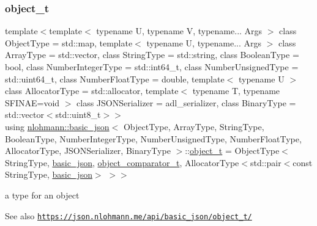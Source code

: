 \subsubsection{\texorpdfstring{object\+\_\+t}{object\_t}}
{\footnotesize\ttfamily template$<$template$<$ typename U, typename V, typename... Args $>$ class Object\+Type = std\+::map, template$<$ typename U, typename... Args $>$ class Array\+Type = std\+::vector, class String\+Type  = std\+::string, class Boolean\+Type  = bool, class Number\+Integer\+Type  = std\+::int64\+\_\+t, class Number\+Unsigned\+Type  = std\+::uint64\+\_\+t, class Number\+Float\+Type  = double, template$<$ typename U $>$ class Allocator\+Type = std\+::allocator, template$<$ typename T, typename S\+F\+I\+N\+A\+E=void $>$ class J\+S\+O\+N\+Serializer = adl\+\_\+serializer, class Binary\+Type  = std\+::vector$<$std\+::uint8\+\_\+t$>$$>$ \\
using \hyperlink{classnlohmann_1_1basic__json}{nlohmann\+::basic\+\_\+json}$<$ Object\+Type, Array\+Type, String\+Type, Boolean\+Type, Number\+Integer\+Type, Number\+Unsigned\+Type, Number\+Float\+Type, Allocator\+Type, J\+S\+O\+N\+Serializer, Binary\+Type $>$\+::\hyperlink{classnlohmann_1_1basic__json_aef3ff5a73597850597d1d40db9edd376}{object\+\_\+t} =  Object\+Type$<$String\+Type, \hyperlink{classnlohmann_1_1basic__json}{basic\+\_\+json}, \hyperlink{classnlohmann_1_1basic__json_ac26c2e8d6bcaccde372ceedd81851200}{object\+\_\+comparator\+\_\+t}, Allocator\+Type$<$std\+::pair$<$const String\+Type, \hyperlink{classnlohmann_1_1basic__json}{basic\+\_\+json}$>$ $>$$>$}



a type for an object 

\begin{DoxySeeAlso}{See also}
\href{https://json.nlohmann.me/api/basic_json/object_t/}{\tt https\+://json.\+nlohmann.\+me/api/basic\+\_\+json/object\+\_\+t/} 
\end{DoxySeeAlso}
\mbox{\label{classnlohmann_1_1basic__json_a24086b03c5c063849df0307f78c41c54}} 
